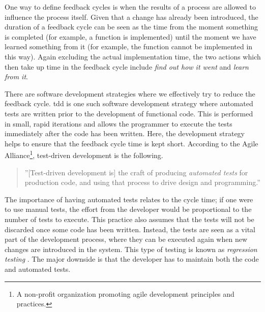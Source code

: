 \documentclass[a4paper,english,12pt]{report}
\begin{document}
One way to define feedback cycles is when the results of a process are allowed to influence the process itself. Given that a change has already been introduced, the duration of a feedback cycle can be seen as the time from the moment something is completed (for example, a function is implemented) until the moment we have learned something from it (for example, the function cannot be implemented in this way). Again excluding the actual implementation time, the two actions which then take up time in the feedback cycle include \textit{find out how it went} and \textit{learn from it}. \citep{kniberg2010kanban}

There are software development strategies where we effectively try to reduce the feedback cycle. \Gls{tdd} is one such software development strategy where automated tests are written prior to the development of functional code. This is performed in small, rapid iterations and allows the programmer to execute the tests immediately after the code has been written. \citep[p. 43]{janzen2005test} Here, the development strategy helps to ensure that the feedback cycle time is kept short. 
According to the Agile Alliance\footnote{A non-profit organization promoting agile development principles and practices.}, test-driven development is the following. \citep[p. 44]{janzen2005test}

\begin{quote}
''[Test-driven development is] the craft of producing \textit{automated tests} for production code, and using that process to drive design and programming.''
\end{quote}

The importance of having automated tests relates to the cycle time; if one were to use manual tests, the effort from the developer would be proportional to the number of tests to execute. This practice also assumes that the tests will not be discarded once some code has been written. Instead, the tests are seen as a vital part of the development process, where they can be executed again when new changes are introduced in the system. \citep[pp. 43-44]{janzen2005test} This type of testing is known as \textit{regression testing} \citep[p. 245]{runeson2012regression}. The major downside is that the developer has to maintain both the code and automated tests. \citep{janzen2005test}
\end{document}
